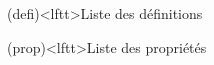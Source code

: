 \documentclass[../../main/main.tex]{subfiles}
\begin{document}
\vspace*{\fill}
\minitoc
\vspace*{\fill}

\newpage

\vspace*{\fill}
\begin{boxes}
	\small
	\begin{tcb}(defi)<lftt>{Liste des définitions}
	\end{tcb}
	\begin{tcb}(prop)<lftt>{Liste des propriétés}
	\end{tcb}

\end{boxes}
\end{document}
